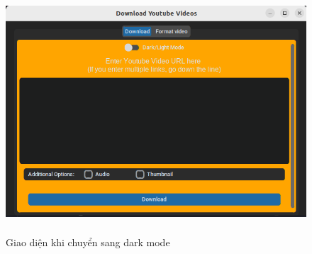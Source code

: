 \documentclass{article} %
\begin{document}
\begin{figure}[H]
    \centering
    \includegraphics[width=15cm, height=9cm]{images/main3.PNG}
    \caption{Giao diện khi chuyển sang dark mode}
    \label{fig:enter-label}
\end{figure}
\end{document}
